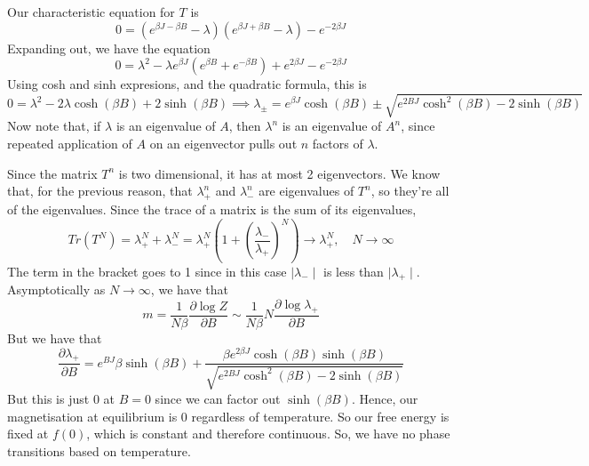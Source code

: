 \documentclass[11pt, oneside]{article}   	%
\begin{document}
Our characteristic equation for $ T $ is 
 \[
	 0 = ( e^{ \beta J - \beta B } - \lambda )( e^{\beta J + \beta B } - \lambda ) - e^{  - 2 \beta J }
\] Expanding out, we have the equation
\[
	0 = \lambda^ 2 - \lambda e^{ \beta J } ( e^{ \beta B } + e ^{ - \beta B } ) + e^{ 2\beta J }  - e^{  - 2 \beta J }
\] Using cosh and sinh expresions, and the quadratic formula, this is 
\[
	0 = \lambda^ 2 - 2 \lambda \cosh ( \beta B ) + 2 \sinh ( \beta B ) \implies \lambda_\pm = e^{ \beta J }\cosh ( \beta B ) \pm \sqrt{ e ^{ 2 B J } \cosh^ 2 ( \beta B ) - 2 \sinh ( \beta B ) } 
\] Now note that, if $ \lambda  $ is an eigenvalue of $ A$, then  $ \lambda^ n $ is an 
eigenvalue of  $ A^ n $, since repeated application of  $A $ on an
eigenvector pulls out  $n $ factors of $ \lambda $. 

Since the matrix $ T ^ n $ is two dimensional, it has at most 2 eigenvectors. 
We know that, for the previous reason, that $ \lambda_+ ^ n $ and  $ \lambda_-^ n $ 
are eigenvalues of  $ T ^n $, so they're all of the eigenvalues. 
Since the trace of a matrix is the sum of its eigenvalues, 
 \[
	 Tr ( T ^ N ) = \lambda_+^ N + \lambda_- ^ N  = \lambda_+^N ( 1 + (\frac{\lambda_-}{\lambda_+ })^ N) \to \lambda_+^N , \quad N \to \infty 
\] The term in the bracket goes to 1 since in this case $  \mid \lambda_-  \mid $ is less than $  \mid  \lambda_+  \mid $. 
Asymptotically as $ N \to \infty$, we have that 
\[
 m  = \frac{1}{N \beta } \frac{\partial \log Z}{\partial B } \sim \frac{1}{N \beta } N \frac{\partial \log \lambda_+ }{\partial B } 
\] But we have that 
\[
	\frac{\partial  \lambda_+ }{\partial B }  = e^{ B J }\beta \sinh ( \beta B ) + \frac{\beta e^{ 2 \beta J } \cosh ( \beta B ) \sinh ( \beta B ) }{\sqrt{ e ^{ 2 B J } \cosh ^ 2 ( \beta B ) - 2 \sinh ( \beta B ) } }
\] But this is just $0 $ at $ B = 0 $ since we can factor out $ \sinh ( \beta B ) $. 
Hence, our magnetisation at equilibrium is  $ 0 $ regardless of temperature. 
So our free energy is fixed at $ f( 0 )$, which is constant and therefore continuous. So, 
we have no phase transitions based on temperature. 

\pagebreak 
\end{document}
